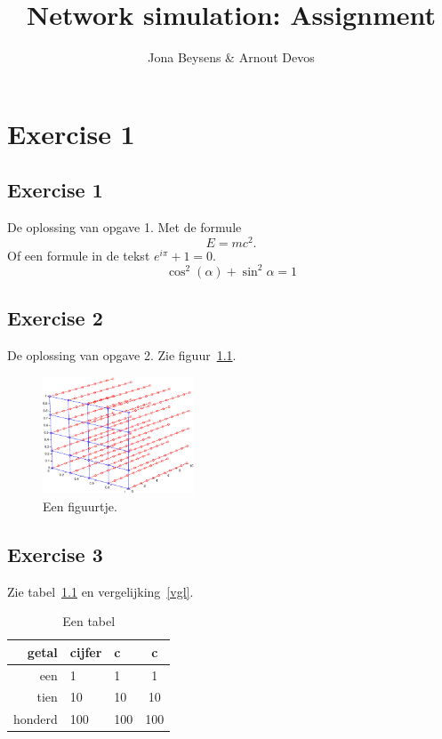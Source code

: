 \documentclass[a4paper]{report}
\title{Network simulation: Assignment}
\author{Jona Beysens \& Arnout Devos}
\newcommand{\opgave}[1]{\section{Exercise #1}}
\begin{document}
\maketitle

\chapter{Exercise 1}
\opgave{1}

De oplossing van opgave 1. Met de formule
\begin{equation*}
E = mc^2.
\end{equation*}
Of een formule in de tekst \(e^{i\pi} + 1 = 0\).
\begin{equation}
\label{vgl}
\cos^2(\alpha) + \sin^2\alpha = 1
\end{equation}

\opgave{2}

De oplossing van opgave 2. Zie figuur~\ref{figuurtje}.

\begin{figure}
\begin{center}
\includegraphics[width=0.4\textwidth]{figuurtje.eps}
\end{center}
\caption{Een figuurtje.}
\label{figuurtje}
\end{figure}


\opgave{3}

Zie tabel~\ref{tab1} en vergelijking~\eqref{vgl}.

\begin{table}
\begin{center}
\begin{tabular}{r|llc}
getal & cijfer & c & c \\\hline
een & 1 & 1 & 1 \\
tien & 10 & 10 & 10 \\
honderd & 100 & 100 & 100
\end{tabular}
\end{center}
\caption{Een tabel}
\label{tab1}
\end{table}
\end{document}
